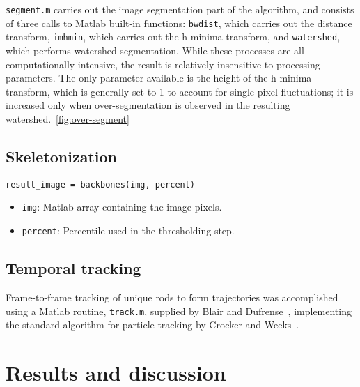 \texttt{segment.m} carries out the image segmentation part of the algorithm, and consists of three calls to
Matlab built-in functions: \texttt{bwdist}, which carries out the distance transform, 
\texttt{imhmin}, which carries out the h-minima transform, and \texttt{watershed}, which performs watershed
segmentation. While these processes are all computationally intensive, the result is relatively insensitive to
processing parameters. The only parameter available is the height of the h-minima transform, which is generally
set to 1 to account for single-pixel fluctuations; 
it is increased only when over-segmentation is observed in the resulting watershed.~\ref{fig:over-segment}

\subsection{Skeletonization}

\texttt{result\_image = backbones(img, percent)}

\begin{itemize}
\item \texttt{img}: Matlab array containing the image pixels.
\item \texttt{percent}: Percentile used in the thresholding step.
\end{itemize}

\subsection{Temporal tracking}

Frame-to-frame tracking of unique rods to form trajectories was accomplished using a Matlab routine, \texttt{track.m}, 
supplied by Blair and Dufrense~\cite{blair-matlab}, implementing the standard algorithm for particle tracking by
Crocker and Weeks~\cite{crocker-tracking}. 

\section{Results and discussion}


